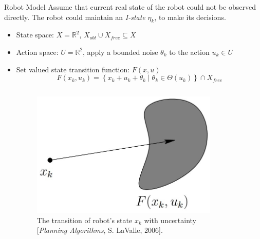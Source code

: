 \documentclass[10pt]{beamer}
\begin{document}
\begin{frame}{Robot Model}
Assume that current real state of the robot could not be observed directly.  The
robot could maintain an \emph{I-state} $\eta_k$, to make its decisions.
\begin{itemize}
\item State space: $X = \mathbb{R}^2$,  $X_{obt} \cup X_{free} \subseteq X$
\item Action space: $U = \mathbb{R}^2$, apply a bounded noise $\theta_k$ to the action
  $u_k \in U$
\item Set valued state transition function: $F(x, u)$
  \begin{equation}
    \label{eq:state-trans}
    F(x_k, u_k) = \left\{
      x_k + u_k + \theta_k
      \mid
      \theta_k \in \Theta(u_k)
    \right\} \cap X_{free}
  \end{equation}
  \begin{columns}
  \begin{column}{0.4\textwidth}
        \begin{figure}
          \centering
          \includegraphics[scale=0.2]{figs/istate.jpg}
          \caption{\scriptsize{The transition of robot's state $x_k$ with
              uncertainty [\emph{Planning Algorithms}, S. LaValle, 2006].}}
        \end{figure}
      \end{column}
      \begin{column}{0.5\textwidth}
          \begin{figure}

\end{figure}
\end{column}
\end{columns}
\end{itemize}
\end{frame}
\end{document}
